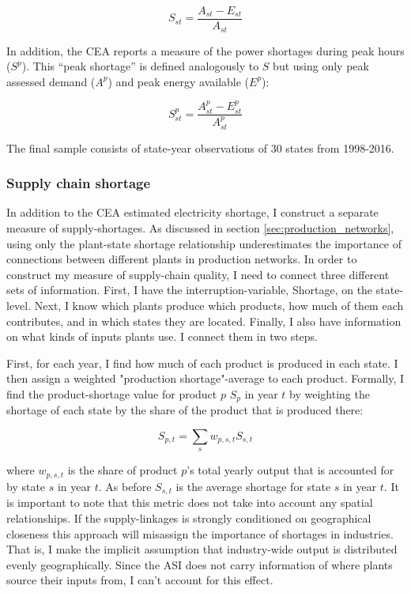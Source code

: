 \documentclass[11pt]{article}
\begin{document}
\[
S_{st} = \frac{A_{st} - E_{st} }{A_{st}}
\]

In addition, the CEA reports a measure of the power shortages during peak hours (\(S^p\)). This ``peak shortage'' is defined analogously to \(S\) but using only peak assessed demand (\(A^{p}\)) and peak energy available (\(E^p\)):

\[
S^{p}_{st} = \frac{A^{p}_{st} - E^{p}_{st}}{A^{p}_{st}}
\]

The final sample consists of state-year observations of 30 states from 1998-2016. 

\subsubsection{Supply chain shortage}%
\label{sub:supply_chain_quality}

In addition to the CEA estimated electricity shortage, I construct a separate measure of supply-shortages. As discussed in section \ref{sec:production_networks}, using only the plant-state shortage relationship underestimates the importance of connections between different plants in production networks. In order to construct my measure of supply-chain quality, I need to connect three different sets of information. First, I have the interruption-variable, Shortage, on the state-level. Next, I know which plants produce which products, how much of them each contributes, and in which states they are located. Finally, I also have information on what kinds of inputs plants use. I connect them in two steps.

First, for each year, I find how much of each product is produced in each state. I then assign a weighted "production shortage"-average to each product. Formally, I find the product-shortage value for product $p$ $S_{p}$ in year $t$ by weighting the shortage of each state by the share of the product that is produced there:

\[
S_{p,t} =  \sum_s w_{p,s,t} S_{s,t}
\]

where $w_{p,s,t}$ is the share of product $p$'s total yearly output that is accounted for by state $s$ in year $t$. As before $S_{s,t}$ is the average shortage for state $s$ in year $t$. It is important to note that this metric does not take into account any spatial relationships. If the supply-linkages is strongly conditioned on geographical closeness this approach will misassign the importance of shortages in industries. That is, I make the implicit assumption that industry-wide output is distributed evenly geographically. Since the ASI does not carry information of where plants source their inputs from, I can't account for this effect.
\end{document}
